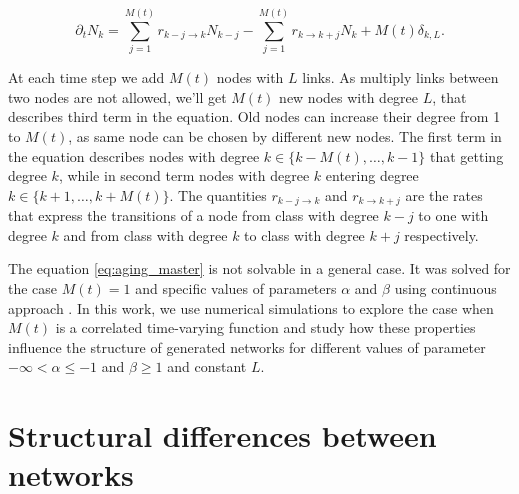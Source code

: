 \begin{equation}
\partial_{t}N_{k}=\sum^{M(t)}_{j=1}r_{k-j\longrightarrow k}N_{k-j}-\sum^{M(t)}_{j=1}r_{k\longrightarrow k+j}N_{k}+M(t)\delta_{k,L} . \label{eq:aging_master}  
\end{equation}

At each time step we add $M(t)$ nodes with $L$ links. As multiply links between two nodes are not allowed, we'll get $M(t)$ new nodes with degree $L$, that describes third term in the equation. Old nodes can increase their degree from 1 to $M(t)$, as same node can be chosen by different new nodes. The first term in the equation describes nodes with degree $k\in\{k-M(t),\ldots, k-1\}$ that getting degree $k$, while in second term nodes with degree $k$ entering degree  $k\in\{k+1,\ldots, k+M(t)\}$. The quantities $r_{k-j\longrightarrow k}$ and $r_{k\longrightarrow k+j}$ are the rates that express the transitions of a node from class with degree $k-j$ to one with degree $k$ and from class with degree $k$ to class with degree $k+j$ respectively. 

The equation \ref{eq:aging_master} is not solvable in a general case. It was solved for the case $M(t)=1$ and specific values of parameters $\alpha$ and $\beta$ using continuous approach \cite{dorogovtsev2001b}. In this work, we use numerical simulations to explore the case when $M(t)$ is a correlated time-varying function and study how these properties influence the structure of generated networks for different values of parameter $-\infty<\alpha\leq-1$ and $\beta\geq1$ and constant $L$.


\section{Structural differences between networks }



